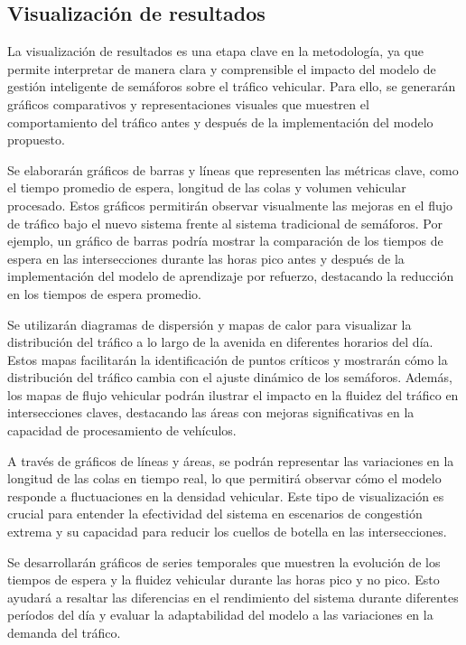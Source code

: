 \subsection{Visualización de resultados}

La visualización de resultados es una etapa clave en la metodología, ya que permite interpretar de manera clara y comprensible el impacto del modelo de gestión inteligente de semáforos sobre el tráfico vehicular. Para ello, se generarán gráficos comparativos y representaciones visuales que muestren el comportamiento del tráfico antes y después de la implementación del modelo propuesto.

Se elaborarán gráficos de barras y líneas que representen las métricas clave, como el tiempo promedio de espera, longitud de las colas y volumen vehicular procesado. Estos gráficos permitirán observar visualmente las mejoras en el flujo de tráfico bajo el nuevo sistema frente al sistema tradicional de semáforos. Por ejemplo, un gráfico de barras podría mostrar la comparación de los tiempos de espera en las intersecciones durante las horas pico antes y después de la implementación del modelo de aprendizaje por refuerzo, destacando la reducción en los tiempos de espera promedio.

Se utilizarán diagramas de dispersión y mapas de calor para visualizar la distribución del tráfico a lo largo de la avenida en diferentes horarios del día. Estos mapas facilitarán la identificación de puntos críticos y mostrarán cómo la distribución del tráfico cambia con el ajuste dinámico de los semáforos. Además, los mapas de flujo vehicular podrán ilustrar el impacto en la fluidez del tráfico en intersecciones claves, destacando las áreas con mejoras significativas en la capacidad de procesamiento de vehículos.

A través de gráficos de líneas y áreas, se podrán representar las variaciones en la longitud de las colas en tiempo real, lo que permitirá observar cómo el modelo responde a fluctuaciones en la densidad vehicular. Este tipo de visualización es crucial para entender la efectividad del sistema en escenarios de congestión extrema y su capacidad para reducir los cuellos de botella en las intersecciones.

Se desarrollarán gráficos de series temporales que muestren la evolución de los tiempos de espera y la fluidez vehicular durante las horas pico y no pico. Esto ayudará a resaltar las diferencias en el rendimiento del sistema durante diferentes períodos del día y evaluar la adaptabilidad del modelo a las variaciones en la demanda del tráfico.

